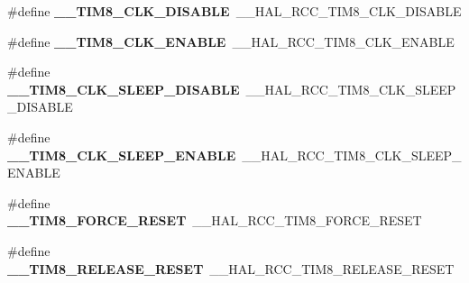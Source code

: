 \begin{DoxyCompactItemize}
\item 
\#define {\bfseries \+\_\+\+\_\+\+T\+I\+M8\+\_\+\+C\+L\+K\+\_\+\+D\+I\+S\+A\+B\+LE}~\+\_\+\+\_\+\+H\+A\+L\+\_\+\+R\+C\+C\+\_\+\+T\+I\+M8\+\_\+\+C\+L\+K\+\_\+\+D\+I\+S\+A\+B\+LE\hypertarget{group___h_a_l___r_c_c___aliased_ga8c2578c8b1027bd9d554276d7c641a03}{}\label{group___h_a_l___r_c_c___aliased_ga8c2578c8b1027bd9d554276d7c641a03}

\item 
\#define {\bfseries \+\_\+\+\_\+\+T\+I\+M8\+\_\+\+C\+L\+K\+\_\+\+E\+N\+A\+B\+LE}~\+\_\+\+\_\+\+H\+A\+L\+\_\+\+R\+C\+C\+\_\+\+T\+I\+M8\+\_\+\+C\+L\+K\+\_\+\+E\+N\+A\+B\+LE\hypertarget{group___h_a_l___r_c_c___aliased_gaabcfb93496a0ddb827e34bdeb9f00f1c}{}\label{group___h_a_l___r_c_c___aliased_gaabcfb93496a0ddb827e34bdeb9f00f1c}

\item 
\#define {\bfseries \+\_\+\+\_\+\+T\+I\+M8\+\_\+\+C\+L\+K\+\_\+\+S\+L\+E\+E\+P\+\_\+\+D\+I\+S\+A\+B\+LE}~\+\_\+\+\_\+\+H\+A\+L\+\_\+\+R\+C\+C\+\_\+\+T\+I\+M8\+\_\+\+C\+L\+K\+\_\+\+S\+L\+E\+E\+P\+\_\+\+D\+I\+S\+A\+B\+LE\hypertarget{group___h_a_l___r_c_c___aliased_gae89db54c079131d2b38ea73963460103}{}\label{group___h_a_l___r_c_c___aliased_gae89db54c079131d2b38ea73963460103}

\item 
\#define {\bfseries \+\_\+\+\_\+\+T\+I\+M8\+\_\+\+C\+L\+K\+\_\+\+S\+L\+E\+E\+P\+\_\+\+E\+N\+A\+B\+LE}~\+\_\+\+\_\+\+H\+A\+L\+\_\+\+R\+C\+C\+\_\+\+T\+I\+M8\+\_\+\+C\+L\+K\+\_\+\+S\+L\+E\+E\+P\+\_\+\+E\+N\+A\+B\+LE\hypertarget{group___h_a_l___r_c_c___aliased_ga7e509c99ad069e570a410c60d9d4fb61}{}\label{group___h_a_l___r_c_c___aliased_ga7e509c99ad069e570a410c60d9d4fb61}

\item 
\#define {\bfseries \+\_\+\+\_\+\+T\+I\+M8\+\_\+\+F\+O\+R\+C\+E\+\_\+\+R\+E\+S\+ET}~\+\_\+\+\_\+\+H\+A\+L\+\_\+\+R\+C\+C\+\_\+\+T\+I\+M8\+\_\+\+F\+O\+R\+C\+E\+\_\+\+R\+E\+S\+ET\hypertarget{group___h_a_l___r_c_c___aliased_ga835e7ae84e532db77f3712753bf49d8a}{}\label{group___h_a_l___r_c_c___aliased_ga835e7ae84e532db77f3712753bf49d8a}

\item 
\#define {\bfseries \+\_\+\+\_\+\+T\+I\+M8\+\_\+\+R\+E\+L\+E\+A\+S\+E\+\_\+\+R\+E\+S\+ET}~\+\_\+\+\_\+\+H\+A\+L\+\_\+\+R\+C\+C\+\_\+\+T\+I\+M8\+\_\+\+R\+E\+L\+E\+A\+S\+E\+\_\+\+R\+E\+S\+ET\hypertarget{group___h_a_l___r_c_c___aliased_ga4e2c51ab362d5c8dc0271d3bf6841b8f}{}\label{group___h_a_l___r_c_c___aliased_ga4e2c51ab362d5c8dc0271d3bf6841b8f}


\end{DoxyCompactItemize}

